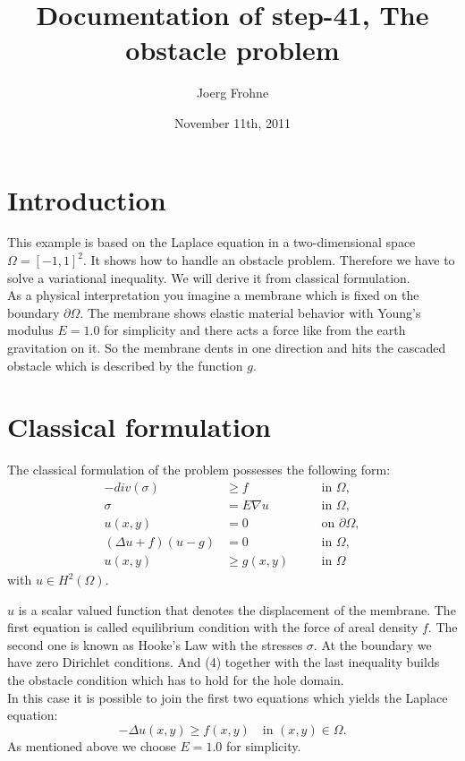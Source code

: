 \documentclass{article}
\title{Documentation of step-41, The obstacle problem}
\author{Joerg Frohne}
\date{November 11th, 2011}
\begin{document}
\maketitle

\section{Introduction}

This example is based on the Laplace equation in a two-dimensional space $\Omega = \left[-1,1\right]^2$. It shows how to handle an obstacle problem. Therefore we have to solve a variational inequality. We will derive it from classical formulation.\\
As a physical interpretation you imagine a membrane which is fixed on the boundary $\partial\Omega$. The membrane shows elastic material behavior with Young's modulus $E = 1.0$ for simplicity and there acts a force like from the earth gravitation on it. So the membrane dents in one direction and hits the cascaded obstacle which is described by the function $g$.

\section{Classical formulation}

The classical formulation of the problem possesses the following form:
\begin{align}
 -div (\sigma) &\geq f & &\quad\text{in } \Omega,\\
 \sigma &= E\nabla u & &\quad\text{in } \Omega,\\
 u(x,y) &= 0 & &\quad\text{on }\partial\Omega,\\
(\Delta u + f)(u - g) &= 0 & &\quad\text{in } \Omega,\\
 u(x,y) &\geq g(x,y) & &\quad\text{in } \Omega
\end{align}
with $u\in H^2(\Omega)$.

\noindent
$u$ is a scalar valued function that denotes the displacement of the membrane. The first equation is called equilibrium condition with the force of areal density $f$. The second one is known as Hooke's Law with the stresses $\sigma$. At the boundary we have zero Dirichlet conditions. And (4) together with the last inequality builds the obstacle condition which has to hold for the hole domain.\\
In this case it is possible to join the first two equations which yields the Laplace equation:
\begin{equation}
 -\Delta u(x,y) \geq f(x,y)\quad\text{in }(x,y)\in \Omega.
\end{equation}
As mentioned above we choose $E=1.0$ for simplicity.
\end{document}
